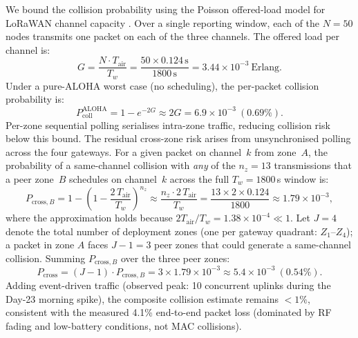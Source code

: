 \documentclass[pdflatex,sn-mathphys-num]{sn-jnl}
\theoremstyle{thmstyleone}
\theoremstyle{thmstyletwo}
\theoremstyle{thmstylethree}
\begin{document}
We bound the collision probability using the Poisson offered-load model for LoRaWAN channel capacity \cite{bor2016lorawan,adelantado2017understanding}. Over a single reporting window, each of the $N = 50$ nodes transmits one packet on each of the three channels. The offered load per channel is:
\begin{equation}
G = \frac{N \cdot T_{\text{air}}}{T_w} = \frac{50 \times 0.124\,\text{s}}{1800\,\text{s}} = 3.44 \times 10^{-3}\ \text{Erlang}.
\label{eq:channel_load}
\end{equation}
Under a pure-ALOHA worst case (no scheduling), the per-packet collision probability is:
\begin{equation}
P_{\text{coll}}^{\text{ALOHA}} = 1 - e^{-2G} \approx 2G = 6.9 \times 10^{-3}\ (0.69\%).
\label{eq:p_coll_aloha}
\end{equation}
Per-zone sequential polling serialises intra-zone traffic, reducing collision risk below this bound. The residual cross-zone risk arises from unsynchronised polling across the four gateways. For a given packet on channel~$k$ from zone~$A$, the probability of a same-channel collision with \emph{any} of the $n_z = 13$ transmissions that a peer zone~$B$ schedules on channel~$k$ across the full $T_w = 1800$\,s window is:
\begin{equation}
P_{\text{cross},B} = 1 - \!\left(1 - \frac{2\,T_{\text{air}}}{T_w}\right)^{\!n_z}
  \approx \frac{n_z \cdot 2\,T_{\text{air}}}{T_w}
  = \frac{13 \times 2 \times 0.124}{1800} \approx 1.79 \times 10^{-3},
\label{eq:p_cross_one}
\end{equation}
where the approximation holds because $2T_{\text{air}}/T_w = 1.38 \times 10^{-4} \ll 1$. Let $J = 4$ denote the total number of deployment zones (one per gateway quadrant: $Z_1$--$Z_4$); a packet in zone $A$ faces $J - 1 = 3$ peer zones that could generate a same-channel collision. Summing $P_{\text{cross},B}$ over the three peer zones:
\begin{equation}
P_{\text{cross}} = (J-1)\cdot P_{\text{cross},B} = 3 \times 1.79 \times 10^{-3} \approx 5.4 \times 10^{-3}\ (0.54\%).
\label{eq:p_cross_total}
\end{equation}
Adding event-driven traffic (observed peak: 10 concurrent uplinks during the Day-23 morning spike), the composite collision estimate remains $< 1\%$, consistent with the measured 4.1\% end-to-end packet loss (dominated by RF fading and low-battery conditions, not MAC collisions).
\end{document}
